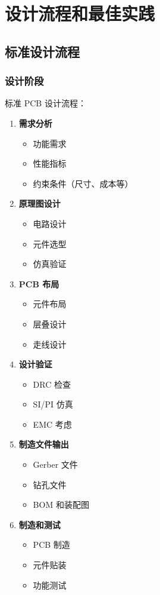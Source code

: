 \section{设计流程和最佳实践}

\subsection{标准设计流程}

\subsubsection{设计阶段}

标准 PCB 设计流程：

\begin{enumerate}
  \item \textbf{需求分析}
    \begin{itemize}
      \item 功能需求
      \item 性能指标
      \item 约束条件（尺寸、成本等）
    \end{itemize}

  \item \textbf{原理图设计}
    \begin{itemize}
      \item 电路设计
      \item 元件选型
      \item 仿真验证
    \end{itemize}

  \item \textbf{PCB 布局}
    \begin{itemize}
      \item 元件布局
      \item 层叠设计
      \item 走线设计
    \end{itemize}

  \item \textbf{设计验证}
    \begin{itemize}
      \item DRC 检查
      \item SI/PI 仿真
      \item EMC 考虑
    \end{itemize}

  \item \textbf{制造文件输出}
    \begin{itemize}
      \item Gerber 文件
      \item 钻孔文件
      \item BOM 和装配图
    \end{itemize}

  \item \textbf{制造和测试}
    \begin{itemize}
      \item PCB 制造
      \item 元件贴装
      \item 功能测试
    \end{itemize}
\end{enumerate}

